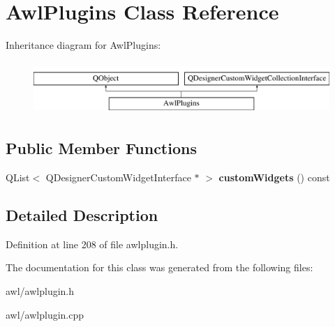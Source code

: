 \hypertarget{class_awl_plugins}{}\section{Awl\+Plugins Class Reference}
\label{class_awl_plugins}
Inheritance diagram for Awl\+Plugins\+:\begin{figure}[H]
\begin{center}
\leavevmode
\includegraphics[height=2.000000cm]{class_awl_plugins}
\end{center}
\end{figure}
\subsection*{Public Member Functions}
\begin{DoxyCompactItemize}
\item 
\mbox{\label{class_awl_plugins_ae3973c431385fb1cc1b1517a62d88c58}} 
Q\+List$<$ Q\+Designer\+Custom\+Widget\+Interface $\ast$ $>$ {\bfseries custom\+Widgets} () const
\end{DoxyCompactItemize}


\subsection{Detailed Description}


Definition at line 208 of file awlplugin.\+h.



The documentation for this class was generated from the following files\+:\begin{DoxyCompactItemize}
\item 
awl/awlplugin.\+h\item 
awl/awlplugin.\+cpp\end{DoxyCompactItemize}
